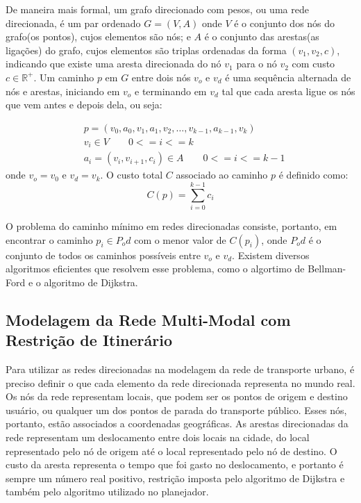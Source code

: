 De maneira mais formal, um grafo direcionado com pesos, ou uma rede direcionada, é um par ordenado $G = (V, A)$ onde $V$ é o conjunto dos nós do grafo(os pontos), cujos elementos são nós; e $A$ é o conjunto das arestas(as ligações) do grafo, cujos elementos são triplas ordenadas da forma $(v_1, v_2, c)$, indicando que existe uma aresta direcionada do nó $v_1$ para o nó $v_2$ com custo $c \in \mathbb{R^+}$.
Um caminho $p$ em $G$ entre dois nós $v_o$ e $v_d$ é uma sequência alternada de nós e arestas, iniciando em $v_o$ e terminando em $v_d$ tal que cada aresta ligue os nós que vem antes e depois dela, ou seja:

\begin{align*}
& p = (v_0, a_0, v_1, a_1, v_2, \ldots ,v_{k-1}, a_{k-1}, v_k) \\
& v_i \in V \qquad 0 <= i <= k \\
& a_i = (v_i, v_{i+1}, c_i) \in A \qquad 0 <= i <= k-1
\end{align*}
onde $v_o = v_0$ e $v_d = v_k$. O custo total $C$ associado ao caminho $p$ é definido como:
\begin{equation*}
C(p) = \sum_{i=0}^{k-1} c_i
\end{equation*}

O problema do caminho mínimo em redes direcionadas consiste, portanto, em encontrar o caminho $p_i \in P_od$ com o menor valor de $C(p_i)$, onde $P_od$ é o conjunto de todos os caminhos possíveis entre $v_o$ e $v_d$. Existem diversos algoritmos eficientes que resolvem esse problema, como o algortimo de Bellman-Ford e o algoritmo de Dijkstra.

\subsection{Modelagem da Rede Multi-Modal com Restrição de Itinerário}

Para utilizar as redes direcionadas na modelagem da rede de transporte urbano, é preciso definir o que cada elemento da rede direcionada representa no mundo real. Os nós da rede representam locais, que podem ser os pontos de origem e destino usuário, ou qualquer um dos pontos de parada do transporte público. Esses nós, portanto, estão associados a coordenadas geográficas.
As arestas direcionadas da rede representam um deslocamento entre dois locais na cidade, do local representado pelo nó de origem até o local representado pelo nó de destino. O custo da aresta representa o tempo que foi gasto no deslocamento, e portanto é sempre um número real positivo, restrição imposta pelo algoritmo de Dijkstra e também pelo algoritmo utilizado no planejador.

